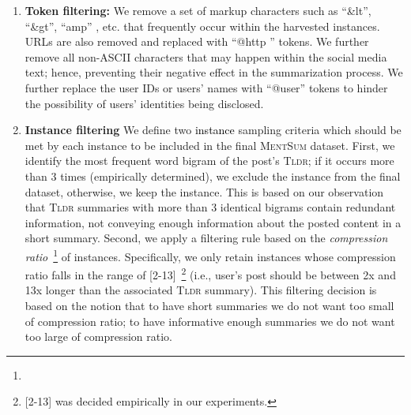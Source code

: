 \documentclass[10pt, a4paper]{article}
\newcommand{\tldr}{\textsc{Tldr}}
\newcommand{\mentsum}{\textsc{MentSum}}
\begin{document}
\begin{enumerate}
    \item \textbf{Token filtering:} We remove a set of markup characters such as ``{\selectfont \&lt}'', ``{\selectfont \&gt}'', ``{\selectfont amp}''
, etc. that frequently occur within the harvested instances. URLs are also removed and replaced with ``{\selectfont @http }'' tokens. We further remove all non-ASCII characters that may happen within the social media text; hence, preventing their negative effect in the summarization process. We further replace the user IDs or users' names with ``{\selectfont @user}'' tokens to hinder the possibility of users' identities being disclosed. 
    
    \item \textbf{Instance filtering
} We define two \textcolor{black}{instance} sampling criteria  which should be met by each instance to be included in the final \mentsum{} dataset. First, we identify the most frequent word bigram of the post's \tldr{}; if it occurs more than 3 times (empirically determined), we exclude the instance from the final dataset, otherwise, we keep the instance. This is based on our observation that \tldr{} summaries with more than 3 identical bigrams contain redundant information, not conveying enough information about the posted content in a short summary. Second, we apply a filtering rule based on the \textit{compression ratio}~\footnote{} of  instances. Specifically, we only retain instances whose compression ratio falls in the range of [2-13]~\footnote{[2-13] was decided empirically in our experiments.} (i.e., user's post should be between 2x and 13x longer than the associated \tldr{} summary). This filtering decision is based on the notion that to have short summaries we do not want too small of compression ratio;  to have informative enough summaries we do not want too large of compression ratio.


\end{enumerate}
\end{document}
